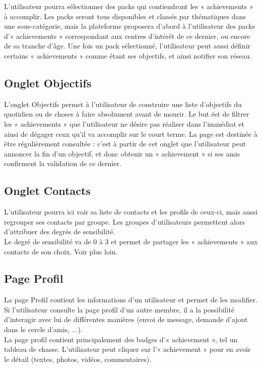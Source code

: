 \documentclass{life-fr}
\begin{document}
L'utilisateur pourra sélectionner des packs qui contiendront les « achievements » à accomplir. Les packs seront tous disponibles et classés par thématiques dans une sous-catégorie, mais la plateforme proposera d'abord à l'utilisateur des packs d'« achievements » correspondant aux centres d'intérêt de ce dernier, ou encore de sa tranche d'âge. Une fois un pack sélectionné, l'utilisateur peut aussi définir certains « achievements » comme étant ses objectifs, et ainsi notifier son réseau.

\subsection{Onglet Objectifs}

L'onglet Objectifs permet à l'utilisateur de construire une liste d'objectifs du quotidien ou de choses à faire absolument avant de mourir. Le but ést de filtrer les « achievements » que l'utilisateur ne désire pas réaliser dans l'immédiat et ainsi de dégager ceux qu'il va accomplir sur le court terme. La page est destinée à être régulièrement consultée : c'est à partir de cet onglet que l'utilisateur peut annoncer la fin d'un objectif, et donc obtenir un « achievement » si ses amis confirment la validation de ce dernier.

\subsection{Onglet Contacts}

L'utilisateur pourra ici voir sa liste de contacts et les profils de ceux-ci, mais aussi regrouper ses contacts par groupe. Les groupes d'utilisateurs permettent alors d'attribuer des degrés de sensibilité.\\
Le degré de sensibilité va de 0 à 3 et permet de partager les « achievements » aux contacts de son choix. Voir plus loin.

\subsection{Page Profil}

La page Profil contient les informations d'un utilisateur et permet de les modifier. Si l'utilisateur consulte la page profil d'un autre membre, il a la possibilité d'interagir avec lui de différentes manières (envoi de message, demande d'ajout dans le cercle d'amis, ...).\\
La page profil contient principalement des badges d'« achievement », tel un tableau de chasse. L'utilisateur peut cliquer sur l'« achievement » pour en avoir le détail (textes, photos, vidéos, commentaires).
\end{document}
